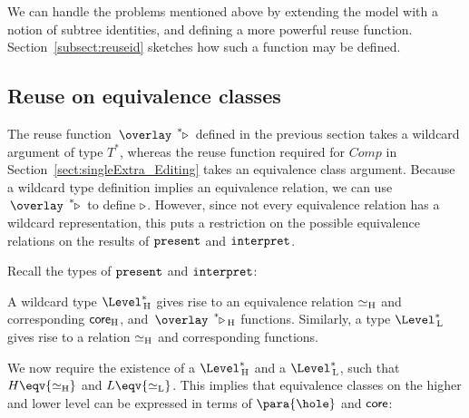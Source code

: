 We can handle the problems mentioned above by extending the model with a notion of subtree identities, and defining a more powerful reuse function. Section~\ref{subsect:reuseid} sketches how such a function may be defined.



\subsection{Reuse on equivalence classes}

The reuse function $\reuzestar$ defined in the previous section takes a wildcard argument of type $T^*$, whereas the reuse function required for $Comp$ in Section~\ref{sect:singleExtra_Editing} takes an equivalence class argument. Because a wildcard type definition implies an equivalence relation, we can use $\reuzestar$ to define $\triangleright$. However, since not every equivalence relation has a wildcard representation, this puts a restriction on the possible equivalence relations on the results of ${\tt present}$ and ${\tt interpret}$.

Recall the types of ${\tt present}$ and ${\tt interpret}$:



A wildcard type $\Level^*\H$ gives rise to an equivalence relation $\simeq_{\rm H}$ and corresponding ${\mathsf {core}}_{\rm H}$, and $\reuzestar_{\rm H}$ functions. Similarly, a type $\Level^*\L$ gives rise to a relation $\simeq_{\rm H}$ and corresponding functions. 

We now require the existence of a $\Level^*\H$ and a $\Level^*\L$, such that $H \eqv {\eqstar_{\rm H}}$ and
$L \eqv {\eqstar_{\rm L}}$. This implies that equivalence classes on the higher and lower level can be expressed in terms of $\para{\hole}$ and ${\mathsf {core}}$:



